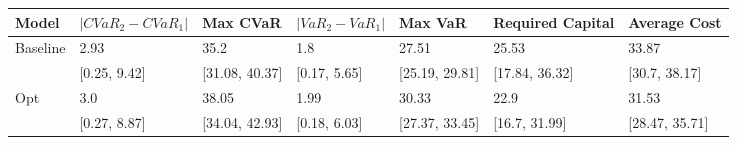 \begin{tabular}{lllllll}
\toprule
   Model & $|CVaR_2 - CVaR_1|$ &       Max CVaR & $|VaR_2 - VaR_1|$ &        Max VaR & Required Capital &   Average Cost \\
\midrule
Baseline &                2.93 &           35.2 &               1.8 &          27.51 &            25.53 &          33.87 \\
         &        [0.25, 9.42] & [31.08, 40.37] &      [0.17, 5.65] & [25.19, 29.81] &   [17.84, 36.32] &  [30.7, 38.17] \\
     Opt &                 3.0 &          38.05 &              1.99 &          30.33 &             22.9 &          31.53 \\
         &        [0.27, 8.87] & [34.04, 42.93] &      [0.18, 6.03] & [27.37, 33.45] &    [16.7, 31.99] & [28.47, 35.71] \\
\bottomrule
\end{tabular}
